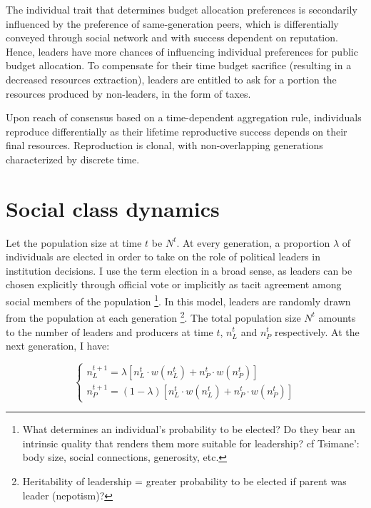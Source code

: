 \documentclass[a4paper]{article}
\begin{document}
The individual trait that determines budget allocation preferences is secondarily influenced by the preference of same-generation peers, which is differentially conveyed through social network and with success dependent on reputation. Hence, leaders have more chances of influencing individual preferences for public budget allocation. To compensate for their time budget sacrifice (resulting in a decreased resources extraction), leaders are entitled to ask for a portion the resources produced by non-leaders, in the form of taxes.

Upon reach of consensus based on a time-dependent aggregation rule, individuals reproduce differentially as their lifetime reproductive success depends on their final resources. Reproduction is clonal, with non-overlapping generations characterized by discrete time.     

\section{Social class dynamics}
\label{sec:elec}

Let the population size at time $t$ be $N^t$. At every generation, a proportion $\lambda$ of individuals are elected in order to take on the role of political leaders in institution decisions. I use the term election in a broad sense, as leaders can be chosen explicitly through official vote or implicitly as tacit agreement among social members of the population \footnote{What determines an individual's probability to be elected? Do they bear an intrinsic quality that renders them more suitable for leadership? cf Tsimane': body size, social connections, generosity, etc.}. 
In this model, leaders are randomly drawn from the population at each generation \footnote{Heritability of leadership = greater probability to be elected if parent was leader (nepotism)?}.
The total population size $N^t$ amounts to the number of leaders and producers at time $t$, $n_L^t$ and $n_P^t$ respectively. At the next generation, I have:

\begin{equation}
	\begin{cases}
	n_L^{t+1}=\lambda\left[n_L^t\cdot w(n_L^t)+n_P^t\cdot w(n_P^t)\right]\\
	n_P^{t+1}=(1-\lambda)\left[n_L^t\cdot w(n_L^t)+n_P^t\cdot w(n_P^t)\right]
	\end{cases}
\end{equation}
\end{document}
